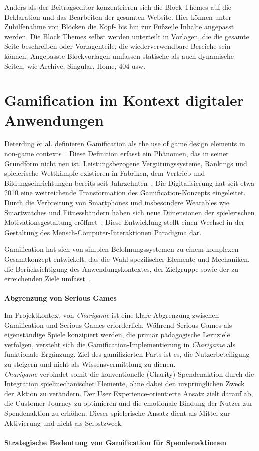 Anders als der Beitragseditor konzentrieren sich die Block Themes auf die Deklaration und das Bearbeiten der gesamten Website.
Hier können unter Zuhilfenahme von Blöcken die Kopf- bis hin zur Fußzeile Inhalte angepasst werden.
Die Block Themes selbst werden unterteilt in Vorlagen, die die gesamte Seite beschreiben oder Vorlagenteile, die wiederverwendbare Bereiche sein können.
Angepasste Blockvorlagen umfassen statische als auch dynamische Seiten, wie Archive, Singular, Home, 404 usw. \cite{wordpress2024EditorTemplates}


\section{Gamification im Kontext digitaler Anwendungen}

Deterding et al. definieren Gamification als \grqq{}the use of game design elements in non-game contexts\grqq{}~\cite{deterding2011gamification}.
Diese Definition erfasst ein Phänomen, das in seiner Grundform nicht neu ist.
Leistungsbezogene Vergütungssysteme, Rankings und spielerische Wettkämpfe existieren in Fabriken, dem Vertrieb und Bildungseinrichtungen bereits seit Jahrzehnten~\cite{bpb2023gamification}.
Die Digitalisierung hat seit etwa 2010 eine weitreichende Transformation des Gamification-Konzepts eingeleitet.
Durch die Verbreitung von Smartphones und insbesondere Wearables wie Smartwatches und Fitnessbändern haben sich neue Dimensionen der spielerischen Motivationsgestaltung eröffnet~\cite{sailer2016gamification}.
Diese Entwicklung stellt einen Wechsel in der Gestaltung des Mensch-Computer-Interaktionen Paradigma dar.

Gamification hat sich von simplen Belohnungssystemen zu einem komplexen Gesamtkonzept entwickelt, das die Wahl spezifischer Elemente und Mechaniken, die Berücksichtigung des Anwendungskontextes, der Zielgruppe sowie der zu erreichenden Ziele umfasst~\cite{bpb2023gamification}.
\\\\
\textbf{Abgrenzung von Serious Games}

Im Projektkontext von \textit{Charigame} ist eine klare Abgrenzung zwischen Gamification und Serious Games erforderlich.
Während Serious Games als eigenständige Spiele konzipiert werden, die primär pädagogische Lernziele verfolgen, versteht sich die Gamification-Implementierung in \textit{Charigame} als funktionale Ergänzung.
Ziel des gamifizierten Parts ist es, die Nutzerbeteiligung zu steigern und nicht als Wissensvermittlung zu dienen.
\\
\textit{Charigame} verbindet somit die konventionelle (Charity)-Spendenaktion durch die Integration spielmechanischer Elemente, ohne dabei den ursprünglichen Zweck der Aktion zu verändern.
Der User Experience-orientierte Ansatz zielt darauf ab, die Customer Journey zu optimieren und die emotionale Bindung der Nutzer zur Spendenaktion zu erhöhen.
Dieser spielerische Ansatz dient als Mittel zur Aktivierung und nicht als Selbstzweck.
\\\\
\textbf{Strategische Bedeutung von Gamification für Spendenaktionen}

